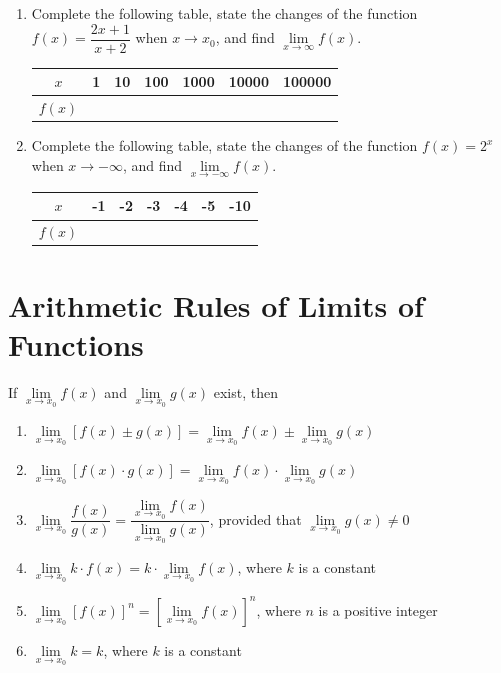 \documentclass[12pt]{report}
\begin{document}
\begin{enumerate}
  \item Complete the following table, state the changes of the function $f(x) =
          \dfrac{2x + 1}{x + 2}$ when $x \to x_0$, and find $\lim\limits_{x \to \infty}
          f(x)$.
        \begin{center}
          \begin{tabular}{|c|c|c|c|c|c|c|}
            \hline
            $x$    & 1 & 10 & 100 & 1000 & 10000 & 100000 \\
            \hline
            $f(x)$ &   &    &     &      &       &        \\
            \hline
          \end{tabular}
        \end{center}

  \item Complete the following table, state the changes of the function $f(x) = 2^x$
        when $x \to -\infty$, and find $\lim\limits_{x \to -\infty} f(x)$.
        \begin{center}
          \begin{tabular}{|c|c|c|c|c|c|c|}
            \hline
            $x$    & -1 & -2 & -3 & -4 & -5 & -10 \\
            \hline
            $f(x)$ &    &    &    &    &    &     \\
            \hline
          \end{tabular}
        \end{center}
\end{enumerate}

\section{Arithmetic Rules of Limits of Functions}

If $\lim\limits_{x \to x_0} f(x)$ and $\lim\limits_{x \to x_0} g(x)$ exist,
then
\begin{enumerate}
  \item $\lim\limits_{x \to x_0} [f(x) \pm g(x)] = \lim\limits_{x \to x_0} f(x) \pm
          \lim\limits_{x \to x_0} g(x)$
  \item $\lim\limits_{x \to x_0} [f(x) \cdot g(x)] = \lim\limits_{x \to x_0} f(x) \cdot \lim\limits_{x \to x_0} g(x)$
  \item $\lim\limits_{x \to x_0} \dfrac{f(x)}{g(x)} = \dfrac{\lim\limits_{x \to x_0} f(x)}{\lim\limits_{x \to x_0} g(x)}$,
        provided that $\lim\limits_{x \to x_0} g(x) \neq 0$
  \item $\lim\limits_{x \to x_0} k \cdot f(x) = k \cdot \lim\limits_{x \to x_0} f(x)$, where $k$ is a constant
  \item $\lim\limits_{x \to x_0} [f(x)]^n = \left[\lim\limits_{x \to x_0} f(x)\right]^n$, where $n$ is a positive integer
  \item $\lim\limits_{x \to x_0} k = k$, where $k$ is a constant
\end{enumerate}
\end{document}
